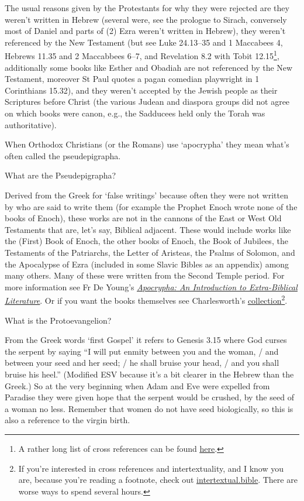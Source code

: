 \documentclass[
]{article}
\begin{document}
The usual reasons given by the Protestants for why they were rejected
are they weren't written in Hebrew (several were, see the prologue to
Sirach, conversely most of Daniel and parts of (2) Ezra weren't written
in Hebrew), they weren't referenced by the New Testament (but see Luke
24.13--35 and 1 Maccabees 4, Hebrews 11.35 and 2 Maccabbees 6--7, and
Revelation 8.2 with Tobit 12.15\footnote{A rather long list of cross
  references can be found
  \href{http://jimmyakin.com/deuterocanonical-references-in-the-new-testament}{\ul{here}}.},
additionally some books like Esther and Obadiah are not referenced by
the New Testament, moreover St Paul quotes a pagan comedian playwright
in 1 Corinthians 15.32), and they weren't accepted by the Jewish people
as their Scriptures before Christ (the various Judean and diaspora
groups did not agree on which books were canon, e.g., the Sadducees held
only the Torah was authoritative).

When Orthodox Christians (or the Romans) use `apocrypha' they mean
what's often called the pseudepigrapha.

What are the Pseudepigrapha?

Derived from the Greek for `false writings' because often they were not
written by who are said to write them (for example the Prophet Enoch
wrote none of the books of Enoch), these works are not in the cannons of
the East or West Old Testaments that are, let's say, Biblical adjacent.
These would include works like the (First) Book of Enoch, the other
books of Enoch, the Book of Jubilees, the Testaments of the Patriarchs,
the Letter of Aristeas, the Psalms of Solomon, and the Apocalypse of
Ezra (included in some Slavic Bibles as an appendix) among many others.
Many of these were written from the Second Temple period. For more
information see Fr De Young's
\href{https://store.ancientfaith.com/apocrypha-an-introduction-to-extra-biblical-literature/}{\emph{\ul{Apocrypha:
An Introduction to Extra-Biblical Literature}}}. Or if you want the
books themselves see Charlesworth's
\href{https://www.amazon.com/Old-Testament-Pseudepigrapha-set/dp/1598564897}{\ul{collection}}\footnote{If
  you're interested in cross references and intertextuality, and I know
  you are, because you're reading a footnote, check out
  \href{http://intertextual.bible}{\ul{intertextual.bible}}. There are
  worse ways to spend several hours.}.

What is the Protoevangelion?

From the Greek words `first Gospel' it refers to Genesis 3.15 where God
curses the serpent by saying ``I will put enmity between you and the
woman, / and between your seed and her seed; / he shall bruise your
head, / and you shall bruise his heel.'' (Modified ESV because it's a
bit clearer in the Hebrew than the Greek.) So at the very beginning when
Adam and Eve were expelled from Paradise they were given hope that the
serpent would be crushed, by the seed of a woman no less. Remember that
women do not have seed biologically, so this is also a reference to the
virgin birth.
\end{document}
